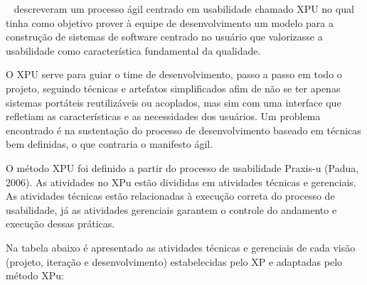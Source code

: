 ~ descreveram um processo ágil centrado em usabilidade chamado XPU no qual tinha como objetivo prover à equipe de desenvolvimento um modelo para a construção de sistemas de software centrado no usuário que valorizasse a usabilidade como característica fundamental da qualidade. 

O XPU serve para guiar o time de desenvolvimento, passo a passo em todo o projeto, seguindo técnicas e artefatos simplificados afim de não se ter apenas sistemas portáteis reutilizáveis ou acoplados, mas sim com uma interface que refletiam as características e as necessidades dos usuários. Um problema encontrado é na sustentação do processo de desenvolvimento baseado em técnicas bem definidas, o que contraria o manifesto ágil.

O método XPU foi definido a partir do processo de usabilidade Praxis-u (Padua, 2006). As atividades no XPu estão divididas em atividades técnicas e gerenciais. As atividades técnicas estão relacionadas à execução correta do processo de usabilidade, já as atividades gerenciais garantem o controle do andamento e execução dessas práticas.

Na tabela abaixo é apresentado as atividades técnicas e gerenciais de cada visão (projeto, iteração e desenvolvimento) estabelecidas pelo XP e adaptadas pelo método XPu:

